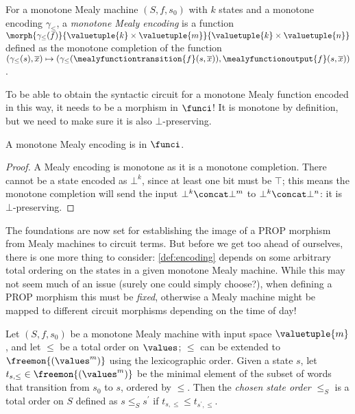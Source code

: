 \begin{definition}\label{def:mealy-encoding}
    For a monotone Mealy machine \((S, f, s_0)\) with \(k\) states and a
    monotone encoding \(\gamma_\leq\), a \emph{monotone Mealy encoding} is a
    function
    \(
        \morph{
            \gamma_\leq(f)
        }{
            \valuetuple{k} \times \valuetuple{m}
        }{
            \valuetuple{k} \times \valuetuple{n}
        }
    \) defined as the monotone completion of the function \(
        (\gamma_\leq(s), \overline{x})
        \mapsto
            (
                \gamma_\leq(\mealyfunctiontransition{f}(s, \overline{x})),
                \mealyfunctionoutput{f}(s, \overline{x})
            )
    \).
\end{definition}

To be able to obtain the syntactic circuit for a monotone Mealy function encoded
in this way, it needs to be a morphism in \(\funci\)!
It is monotone by definition, but we need to make sure it is also
\(\bot\)-preserving.

\begin{lemma}
    A monotone Mealy encoding is in \(\funci\).
\end{lemma}
\begin{proof}
    A Mealy encoding is monotone as it is a monotone completion.
    There cannot be a state encoded as \(\bot^k\), since at least one bit must
    be \(\top\); this means the monotone completion will send the input
    \(\bot^k \concat \bot^m\) to \(\bot^k \concat \bot^n\): it is
    \(\bot\)-preserving.
\end{proof}

The foundations are now set for establishing the image of a PROP morphism from
Mealy machines to circuit terms.
But before we get too ahead of ourselves, there is one more thing to consider:
\cref{def:encoding} depends on some arbitrary total ordering on the states in a
given monotone Mealy machine.
While this may not seem much of an issue (surely one could simply choose?), when
defining a PROP morphism this must be \emph{fixed}, otherwise a Mealy machine
might be mapped to different circuit morphisms depending on the time of day!

\begin{definition}
    Let \((S, f, s_0)\) be a monotone Mealy machine with input space
    \(\valuetuple{m}\), and let \(\leq\) be a total order on \(\values\);
    \(\leq\) can be extended to \(\freemon{(\values^m)}\) using the
    lexicographic order.
    Given a state \(s\), let \(t_{s,\leq} \in \freemon{(\values^m)}\) be
    the minimal element of the subset of words that transition from \(s_0\) to
    \(s\), ordered by \(\leq\).
    Then the \emph{chosen state order} \(\leq_S\) is a total order on \(S\)
    defined as \(s \leq_S s^\prime\) if \(t_{s,\leq} \leq t_{s^\prime,\leq}\).
\end{definition}

